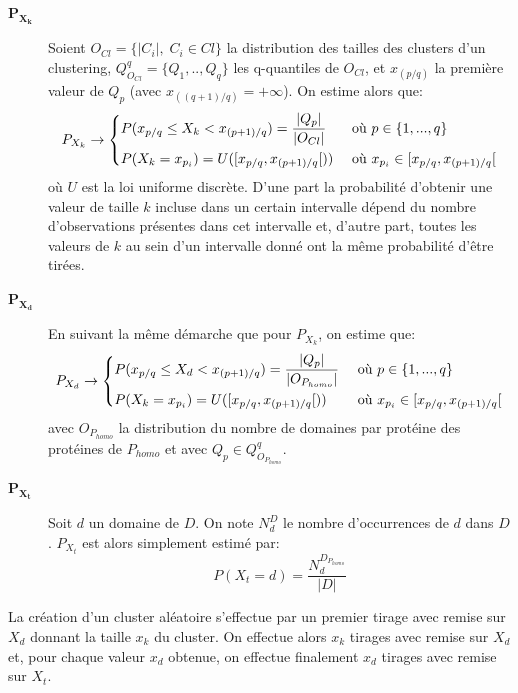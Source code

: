 	\begin{description}
		\item[$\mathbf{P_{X_{k}}}$] Soient $O_{Cl}=\{|C_{i}|, \;  C_{i} \in Cl\}$ la distribution des tailles des clusters d'un clustering, $Q^{q}_{O_{Cl}}=\{Q_{1},..,Q_{q}\}$ les q-quantiles de $O_{Cl}$, et $x_{(p/q)}$ la première valeur de $Q_{p}$ (avec $x_{((q+1)/q)}=+\infty$). On estime alors que:
			\begin{equation}\label{Xk}
				P_{X_{k}} \to
				\begin{dcases}
				P(x_{p/q}\leq X_{k}<x_{(p+1)/q})= \frac{|Q_{p}|}{|O_{Cl}|} & \textrm{ où } p \in \{1,...,q\}\\
				P(X_{k}=x_{p_{i}})=U([x_{p/q},x_{(p+1)/q}[)) &  \textrm{ où }  x_{p_{i}} \in [x_{p/q},x_{(p+1)/q}[\\
				\end{dcases}
			\end{equation}
		où $U$ est la loi uniforme discrète. D'une part la probabilité d'obtenir une valeur de taille $k$ incluse dans un certain intervalle dépend du nombre d'observations présentes dans cet intervalle et, d'autre part, toutes les valeurs de $k$ au sein d'un intervalle donné ont la même probabilité d'être tirées.
		\item[$\mathbf{P_{X_{d}}}$] En suivant la même démarche que pour $P_{X_{k}}$, on estime  que:
     			\begin{equation}\label{Xd}
				P_{X_{d}} \to
				\begin{dcases}
				P(x_{p/q} \leq X_{d}<x_{(p+1)/q})= \frac{|Q_{p}|}{|O_{P_{homo}}|} & \textrm{ où }   p \in \{1,...,q\}\\
				P(X_{k}=x_{p_{i}})=U([x_{p/q},x_{(p+1)/q}[)) &  \textrm{ où }  x_{p_{i}} \in [x_{p/q},x_{(p+1)/q}[\\      
				\end{dcases}
			\end{equation}
		avec  $O_{P_{homo}}$ la distribution du nombre de domaines par protéine des protéines de $P_{homo}$ et avec $Q_{p} \in Q^{q}_{O_{P_{homo}}}$.
		\item[$\mathbf{P_{X_{t}}}$] Soit $d$ un domaine de $D$. On note $N_{d}^{D}$ le nombre d'occurrences de $d$ dans $D$. $P_{X_{t}}$ est alors simplement estimé par: 
			\begin{equation}\label{Xt}
				P(X_{t}=d)=\frac{N_{d}^{D_{P_{homo}}}}{|D|}
			\end{equation}     
     \end{description}
La création d'un cluster aléatoire s'effectue par un premier tirage avec remise sur $X_{d}$ donnant la taille $x_{k}$ du cluster. On effectue alors $x_{k}$ tirages avec remise sur $X_{d}$ et, pour chaque valeur $x_{d}$ obtenue, on effectue finalement $x_{d}$ tirages avec remise sur $X_{t}$.   
    
